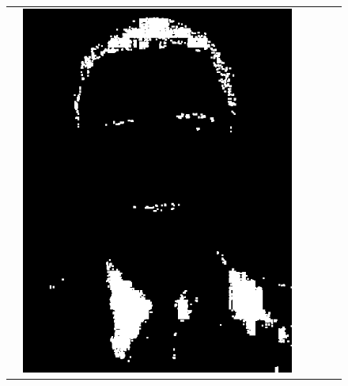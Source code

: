 \documentclass[journal,onecolumn]{IEEEtran}
\begin{document}
\begin{figure}[htb]
{\begin{tabular}{cccccc}
&

	\includegraphics[scale=0.3]{images/hairQuantization.png}

&


\end{tabular}}
\end{figure}
\end{document}
